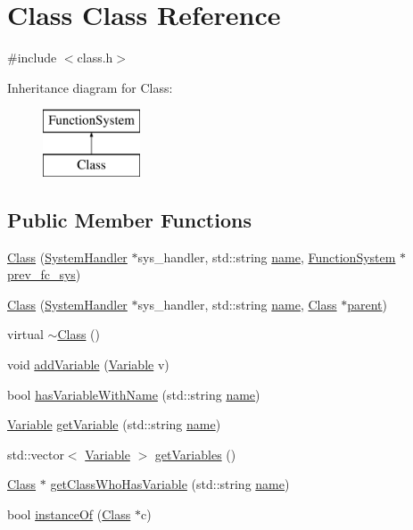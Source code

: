 \hypertarget{classClass}{}\section{Class Class Reference}
\label{classClass}


{\ttfamily \#include $<$class.\+h$>$}

Inheritance diagram for Class\+:\begin{figure}[H]
\begin{center}
\leavevmode
\includegraphics[height=2.000000cm]{classClass}
\end{center}
\end{figure}
\subsection*{Public Member Functions}
\begin{DoxyCompactItemize}
\item 
\hyperlink{classClass_a1c88be1af88c4c9b3c054d124ce44b6e}{Class} (\hyperlink{classSystemHandler}{System\+Handler} $\ast$sys\+\_\+handler, std\+::string \hyperlink{classClass_aac209ee2e03afc3bc9e93fd1fd46256b}{name}, \hyperlink{classFunctionSystem}{Function\+System} $\ast$\hyperlink{classFunctionSystem_a0d223ca42b6d6617af61136bdb1f33dd}{prev\+\_\+fc\+\_\+sys})
\item 
\hyperlink{classClass_a1b960c202d43c46097e267e5c4e259ef}{Class} (\hyperlink{classSystemHandler}{System\+Handler} $\ast$sys\+\_\+handler, std\+::string \hyperlink{classClass_aac209ee2e03afc3bc9e93fd1fd46256b}{name}, \hyperlink{classClass}{Class} $\ast$\hyperlink{classClass_a1f94bc39c04d18b5c4421862f8506d1d}{parent})
\item 
virtual \hyperlink{classClass_aa3b9e4e0df41778f3d26777c1eb62898}{$\sim$\+Class} ()
\item 
void \hyperlink{classClass_a0c10b6fc7440f229da43f013271c0506}{add\+Variable} (\hyperlink{classVariable}{Variable} v)
\item 
bool \hyperlink{classClass_a0c5ffb0b7e3e95dedad01b8b4e91d93b}{has\+Variable\+With\+Name} (std\+::string \hyperlink{classClass_aac209ee2e03afc3bc9e93fd1fd46256b}{name})
\item 
\hyperlink{classVariable}{Variable} \hyperlink{classClass_a5c5de4f3c1419dedc92fc3d982fc6f65}{get\+Variable} (std\+::string \hyperlink{classClass_aac209ee2e03afc3bc9e93fd1fd46256b}{name})
\item 
std\+::vector$<$ \hyperlink{classVariable}{Variable} $>$ \hyperlink{classClass_ab24282751aa8b0ba2b2c71fbd3eef7e5}{get\+Variables} ()
\item 
\hyperlink{classClass}{Class} $\ast$ \hyperlink{classClass_aec836433f28bcfb9bf013ce79f24ba23}{get\+Class\+Who\+Has\+Variable} (std\+::string \hyperlink{classClass_aac209ee2e03afc3bc9e93fd1fd46256b}{name})
\item 
bool \hyperlink{classClass_a9bbffa241c269033a12c76f85af9c5ac}{instance\+Of} (\hyperlink{classClass}{Class} $\ast$c)
\end{DoxyCompactItemize}
